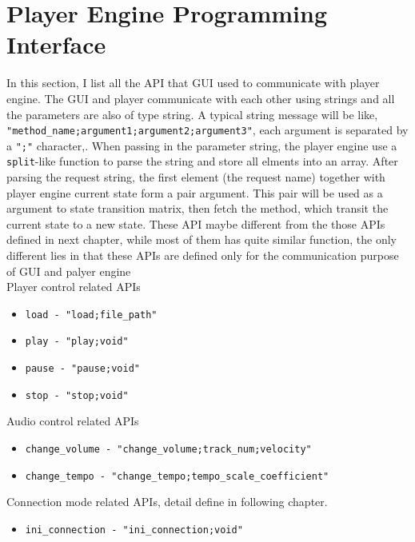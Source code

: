 \section{Player Engine Programming Interface}
In this section, I list all the API that GUI used to communicate with player 
engine. The GUI and player communicate with each other using strings and 
all the parameters are also of type string. A typical string message will be 
like, \texttt{"method\_name;argument1;argument2;argument3"}, each argument is 
separated by a \texttt{";"}
character,. When passing in the parameter string, the player engine
use a \texttt{split}-like function to parse the string and store all elments 
into an array. After parsing the request string, the first element (the request name) 
together with player engine current state form a pair argument. This pair 
will be used as a argument to state transition matrix, then fetch the method, which
transit the current state to a new state.
These API maybe different
from the those APIs defined in next chapter, while most of them has quite similar 
function, the only different lies in that these APIs are defined only for the 
communication purpose of GUI and palyer engine \\
Player control related APIs 
\begin{itemize}
  \item \texttt{load - "load;file\_path"}
  \item \texttt{play - "play;void"}  
  \item \texttt{pause - "pause;void"}
  \item \texttt{stop - "stop;void"}
\end{itemize}
Audio control related APIs
\begin{itemize}
  \item \texttt{change\_volume - "change\_volume;track\_num;velocity"}  
  \item \texttt{change\_tempo - "change\_tempo;tempo\_scale\_coefficient"}  
\end{itemize}
Connection mode related APIs, detail define in following chapter.
\begin{itemize}
  \item \texttt{ini\_connection - "ini\_connection;void"}  
\end{itemize}
